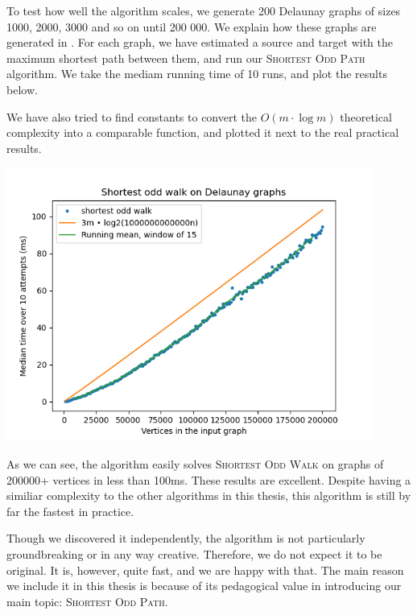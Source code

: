 To test how well the algorithm scales, we generate 200 Delaunay graphs of sizes 1000, 2000, 3000 and so on until 200 000. We explain how these graphs are generated in . For each graph, we have estimated a source and target with the maximum shortest path between them, and run our \textsc{Shortest Odd Path} algorithm. We take the mediam running time of 10 runs, and plot the results below.

We have also tried to find constants to convert the $O(m \cdot \log m)$ theoretical complexity into a comparable function, and plotted it next to the real practical results.

\includegraphics[width=12cm]{figures/bench_plots/shortest odd walk.png}

As we can see, the algorithm easily solves \textsc{Shortest Odd Walk} on graphs of 200000+ vertices in less than 100ms. These results are excellent. Despite having a similiar complexity to the other algorithms in this thesis, this algorithm is still by far the fastest in practice.

Though we discovered it independently, the algorithm is not particularly groundbreaking or in any way creative. Therefore, we do not expect it to be original. It is, however, quite fast, and we are happy with that. The main reason we include it in this thesis is because of its pedagogical value in introducing our main topic: \textsc{Shortest Odd Path}. 